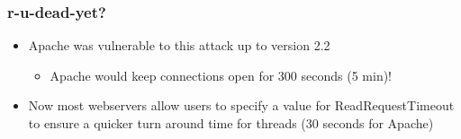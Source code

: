\documentclass{beamer}
\begin{document}
\begin{frame}
	\frametitle{r-u-dead-yet?}
	\begin{itemize}
		\item Apache was vulnerable to this attack up to version 2.2 
			\begin{itemize}
				\item Apache would keep connections open for 300 seconds (5 min)!
			\end{itemize}
		\item Now most webservers allow users to specify a value for
			{\ttfamily ReadRequestTimeout} to ensure a quicker turn around time for
			threads  (30 seconds for Apache)
	\end{itemize}
\end{frame}
\end{document}
